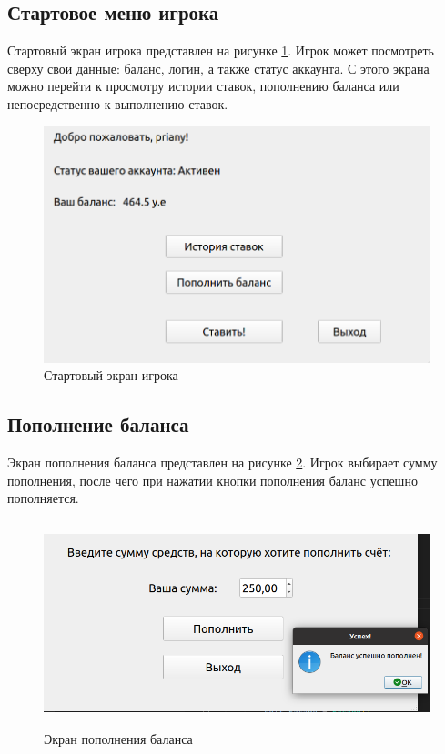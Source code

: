 \subsection{Стартовое меню игрока}
Стартовый экран игрока представлен на рисунке \ref{fig::user}. 
Игрок может посмотреть сверху свои данные: баланс, логин, а также статус аккаунта.
С этого экрана можно перейти к просмотру истории ставок, пополнению баланса или непосредственно к выполнению ставок.

\FloatBarrier
\begin{figure}[hp]	
	\begin{center}
		\includegraphics[width=\linewidth]{inc/user.png}
	\end{center}
	\caption{Стартовый экран игрока}
	\label{fig::user}
\end{figure}
\FloatBarrier

\subsection{Пополнение баланса}
Экран пополнения баланса представлен на рисунке \ref{fig::balance}. 
Игрок выбирает сумму пополнения, после чего при нажатии кнопки пополнения баланс успешно пополняется.

\FloatBarrier
\begin{figure}[h]	
	\begin{center}
		\includegraphics[height = 6cm, width=\linewidth]{inc/balance.png}
	\end{center}
	\caption{Экран пополнения баланса}
	\label{fig::balance}
\end{figure}
\FloatBarrier

